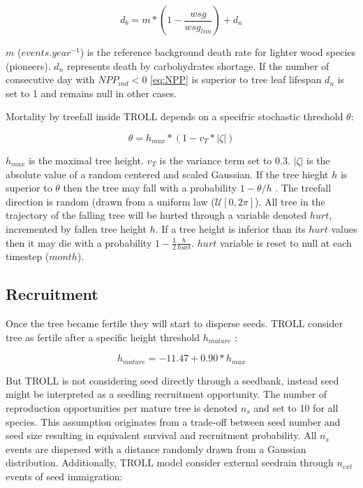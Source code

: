 \documentclass[]{article}
\theoremstyle{definition}
\theoremstyle{definition}
\theoremstyle{remark}
\begin{document}
\begin{equation}
  d_b = m*(1-\frac{wsg}{wsg_{lim}})+d_n
  \label{eq:db}
\end{equation}

\(m\) (\(events.year^{-1}\)) is the reference background death rate for
lighter wood species (pioneers). \(d_n\) represents death by
carbohydrates shortage. If the number of consecutive day with
\(NPP_{ind} < 0\) \eqref{eq:NPP} is superior to tree leaf lifespan \(d_n\)
is set to 1 and remains null in other cases.

Mortality by treefall inside TROLL depends on a specifric stochastic
threshold \(\theta\):

\begin{equation}
  \theta = h_{max}*(1-v_T*|\zeta|)
  \label{eq:theta}
\end{equation}

\(h_{max}\) is the maximal tree height. \(v_T\) is the variance term set
to 0.3. \(|\zeta|\) is the absolute value of a random centered and
scaled Gaussian. If the tree hieght \(h\) is superior to \(\theta\) then
the tree may fall with a probability \(1-\theta/h\) \citep{Chave1999}.
The treefall direction is random (drawn from a uniform law
(\(\mathcal{U}[0,2\pi]\)). All tree in the trajectory of the falling
tree will be hurted through a variable denoted \(hurt\), incremented by
fallen tree height \(h\). If a tree height is inferior than its \(hurt\)
values then it may die with a probability
\(1-\frac{1}{2}\frac{h}{hurt}\). \(hurt\) variable is reset to null at
each timestep (\(month\)).

\subsection{Recruitment}\label{recruitment}

Once the tree became fertile they will start to disperse seeds. TROLL
consider tree as fertile after a specific height threshold
\(h_{mature}\) \citep{Wright2005}:

\begin{equation}
  h_{mature} = -11.47+0.90*h_{max}
  \label{eq:hmature}
\end{equation}

But TROLL is not considering seed directly through a seedbank, instead
seed might be interpreted as a seedling recruitment opportunity. The
number of reproduction opportunities per mature tree is denoted \(n_s\)
and set to 10 for all species. This assumption originates from a
trade-off between seed number and seed size resulting in equivalent
survival and recruitment probability. All \(n_s\) events are dispersed
with a distance randomly drawn from a Gaussian distribution.
Additionally, TROLL model consider external seedrain through \(n_{ext}\)
events of seed immigration:
\end{document}
